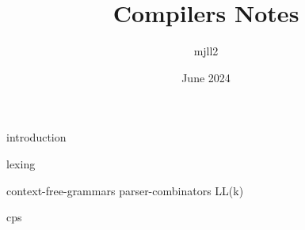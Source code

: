 \documentclass[12pt,a4paper,twoside,openany, chapterprefix=on]{scrbook}
\title{Compilers Notes}
\author{mjll2}
\date{June 2024}
\begin{document}
\maketitle

{introduction}

{lexing}

{context-free-grammars}
{parser-combinators}
{LL(k)}

{cps}


\end{document}
